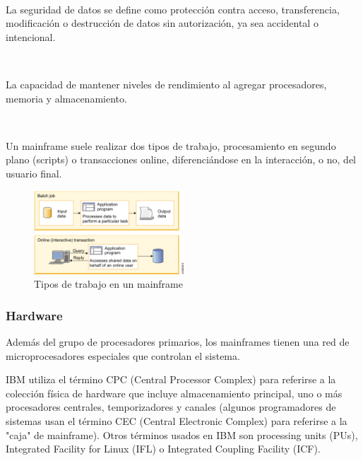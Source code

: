 \documentclass[paper=a4, fontsize=10pt]{scrartcl} %
\numberwithin{equation}{section} %
\numberwithin{figure}{section} %
\numberwithin{table}{section} %
\begin{document}
\

La seguridad de datos se define como protección contra acceso, transferencia, modificación o destrucción de datos sin autorización, ya sea accidental o intencional.

\

La capacidad de mantener niveles de rendimiento al agregar procesadores, memoria y almacenamiento.

\

Un mainframe suele realizar dos tipos de trabajo, procesamiento en segundo plano (scripts) o transacciones online, diferenciándose en la interacción, o no, del usuario final.

\begin{figure}[H]
	\centering
	\label{workloads}
	\includegraphics[trim = 0mm 0mm 5mm 0mm, clip, width=0.5\textwidth]{./Imagenes/workloads.png}
	\caption{Tipos de trabajo en un mainframe \cite{ibm-mainframes}}
\end{figure}

\subsubsection{Hardware}
Además del grupo de procesadores primarios, los mainframes tienen una red de microprocesadores especiales que controlan el sistema.


IBM utiliza el término CPC (Central Processor Complex) para referirse a la colección física de hardware que incluye almacenamiento principal, uno o más procesadores centrales, temporizadores y canales (algunos programadores de sistemas usan el término CEC (Central Electronic Complex) para referirse a la "caja" de mainframe).
Otros términos usados en IBM son processing units (PUs), Integrated Facility for Linux (IFL) o Integrated Coupling Facility (ICF).
\end{document}
